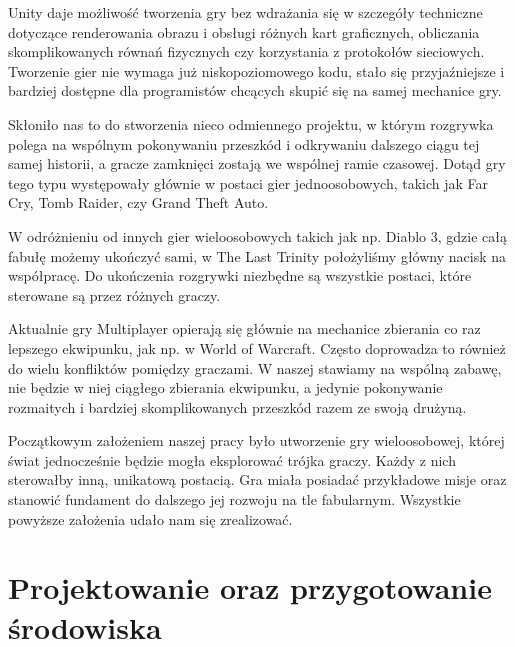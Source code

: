 \documentclass[openright]{xmgr}
\begin{document}
  Unity daje możliwość tworzenia gry bez wdrażania się w szczegóły techniczne dotyczące renderowania obrazu i obsługi różnych kart graficznych, obliczania skomplikowanych równań fizycznych czy korzystania z protokołów sieciowych. Tworzenie gier nie wymaga już niskopoziomowego kodu, stało się przyjaźniejsze i bardziej dostępne dla programistów chcących skupić się na samej mechanice gry.

  Skłoniło nas to do stworzenia nieco odmiennego projektu, w którym rozgrywka polega na wspólnym pokonywaniu przeszkód i odkrywaniu dalszego ciągu tej samej historii, a gracze zamknięci zostają we wspólnej ramie czasowej. Dotąd gry tego typu występowały głównie w postaci gier jednoosobowych, takich jak Far Cry, Tomb Raider, czy Grand Theft Auto.

  W odróżnieniu od innych gier wieloosobowych takich jak np. Diablo 3, gdzie całą fabułę możemy ukończyć sami, w The Last Trinity położyliśmy główny nacisk na współpracę. Do ukończenia rozgrywki niezbędne są wszystkie postaci, które sterowane są przez różnych graczy.

  Aktualnie gry Multiplayer opierają się głównie na mechanice zbierania co raz lepszego ekwipunku, jak np. w World of Warcraft. Często doprowadza to również do wielu konfliktów pomiędzy graczami. W naszej stawiamy na wspólną zabawę, nie będzie w niej ciągłego zbierania ekwipunku, a jedynie pokonywanie rozmaitych i bardziej skomplikowanych przeszkód razem ze swoją drużyną.

  Początkowym założeniem naszej pracy było utworzenie gry wieloosobowej, której świat jednocześnie będzie mogła eksplorować trójka graczy. Każdy z nich sterowałby inną, unikatową postacią. 
  Gra miała posiadać przykładowe misje oraz stanowić fundament do dalszego jej rozwoju na tle fabularnym. Wszystkie powyższe założenia udało nam się zrealizować. 

\chapter{Projektowanie oraz przygotowanie środowiska}
\end{document}
